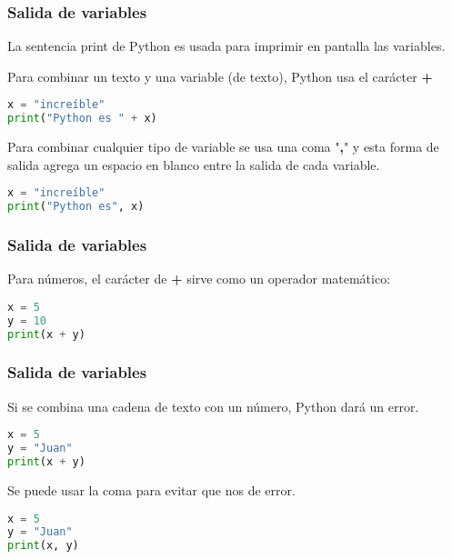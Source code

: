 \begin{frame}[fragile]
  \frametitle{Salida de variables}

  La sentencia \textcolor{codeKeyword}{print} de Python es usada para
  imprimir en pantalla las variables.

  \vspace{\baselineskip}
  Para combinar un texto y una variable (de texto), Python usa el carácter
  \textbf{+}

  \begin{lstlisting}[language=Python]
x = "increíble"
print("Python es " + x)
  \end{lstlisting}

  \pausa
  Para combinar cualquier tipo de variable se usa una coma "\textbf{,}" y
  esta forma de salida agrega un espacio en blanco entre la salida de cada
  variable.

  \vspace{\baselineskip}
  \begin{lstlisting}[language=Python]
x = "increíble"
print("Python es", x)
  \end{lstlisting}


\end{frame}

\begin{frame}[fragile]
  \frametitle{Salida de variables}

  Para números, el carácter de \textbf{+} sirve como un
  operador matemático:

  \vspace{\baselineskip}
  \begin{lstlisting}[language=Python]
x = 5
y = 10
print(x + y)
  \end{lstlisting}
\end{frame}

\begin{frame}[fragile]
  \frametitle{Salida de variables}

  \begin{alertblock}{}
    Si se combina una cadena de texto con un número, Python dará un error.
  \end{alertblock}

  \begin{lstlisting}[language=Python]
x = 5
y = "Juan"
print(x + y)
  \end{lstlisting}

  \pausa
  \begin{exampleblock}{}
    Se puede usar la coma para evitar que nos de error.
  \end{exampleblock}

  \begin{lstlisting}[language=Python]
x = 5
y = "Juan"
print(x, y)
  \end{lstlisting}
\end{frame}

